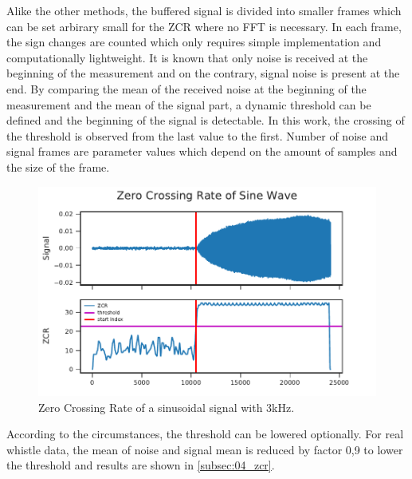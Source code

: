 Alike the other methods, the buffered signal is divided into smaller frames
which can be set arbirary small for the \ac{ZCR} where no \ac{FFT} is necessary.
In each frame, the sign changes are counted which only requires simple implementation
and computationally lightweight.
It is known that only noise is received at the beginning of the measurement and on the
contrary, signal noise is present at the end.
By comparing the mean of the received noise at the beginning of the measurement and
the mean of the signal part, a dynamic threshold can be defined and the beginning of the
signal is detectable.
In this work, the crossing of the threshold is observed from the last
value to the first.
Number of noise and signal frames are parameter values which depend
on the amount of samples and the size of the frame.
\begin{figure}[ht]
	\centering
		\includegraphics[]{figures/sine_zcr}
	\caption{Zero Crossing Rate of a sinusoidal signal with 3\si{\kilo\hertz}.}
	\label{fig:03_zcr}
\end{figure}
According to the circumstances, the threshold can be lowered optionally.
For real whistle data, the mean of noise and signal mean is reduced by factor 0,9 to
lower the threshold and results are shown in \cref{subsec:04_zcr}.
